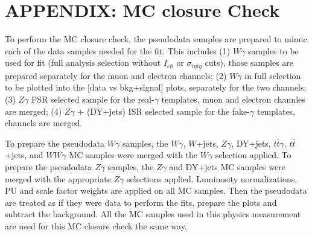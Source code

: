 \section{APPENDIX: MC closure Check}
\label{sec:MCclosureCheck}

To perform the MC closure check, the pseudodata samples are prepared to mimic each of the data samples needed for the fit. This includes (1) $W\gamma$ samples to be used for fit (full analysis selection without $I_{ch}$ or $\sigma_{i\eta i\eta}$ cuts), those samples are prepared separately for the muon and electron channels; (2) $W\gamma$ in full selection to be plotted into the [data vs bkg+signal] plots, separately for the two channels; (3) $Z\gamma$ FSR selected sample for the real-$\gamma$ templates, muon and electron channles are merged; (4) $Z\gamma$ + (DY+jets) ISR selected sample for the fake-$\gamma$ templates, channels are merged. 

To prepare the pseudodata $W\gamma$ samples, the $W\gamma$, $W$+jets, $Z\gamma$, DY+jets, $t\bar{t}\gamma$, $t\bar{t}$+jets, and $WW\gamma$ MC samples were merged with the $W\gamma$ selection applied. To prepare the pseudodata $Z\gamma$ samples, the $Z\gamma$ and DY+jets MC samples were merged with the appropriate $Z\gamma$ selections applied. Luminosity normalizations, PU and scale factor weights are applied on all MC samples. Then the pseudodata are treated as if they were data to perform the fits, prepare the plots and subtract the background. All the MC samples used in this physics measurement are used for this MC closure check the same way.

